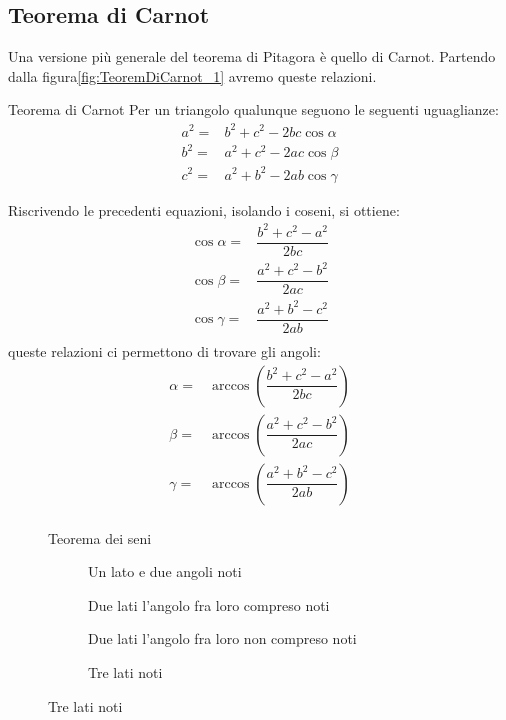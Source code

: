 \subsection{Teorema di Carnot}
Una versione più generale del teorema di Pitagora è quello di Carnot. Partendo dalla figura\nobs\vref{fig:TeoremDiCarnot_1} avremo queste relazioni.
\begin{teoremat}{Teorema di Carnot}{}
	Per un triangolo qualunque seguono le seguenti uguaglianze:
	\begin{align*}
	a^2=&b^2+c^2-2bc\cos\alpha\\
	b^2=&a^2+c^2-2ac\cos\beta\\
	c^2=&a^2+b^2-2ab\cos\gamma
	\end{align*}
\end{teoremat}
Riscrivendo  le precedenti equazioni, isolando i coseni, si ottiene:
\begin{align*}
\cos\alpha=&\dfrac{b^2+c^2-a^2}{2bc}\\
\cos\beta=&\dfrac{a^2+c^2-b^2}{2ac}\\
\cos\gamma=&\dfrac{a^2+b^2-c^2}{2ab}\\
\end{align*}
queste relazioni ci  permettono di trovare gli angoli:
\begin{align*}
\alpha=&\arccos(\dfrac{b^2+c^2-a^2}{2bc})\\
\beta=&\arccos(\dfrac{a^2+c^2-b^2}{2ac})\\
\gamma=&\arccos(\dfrac{a^2+b^2-c^2}{2ab})\\
\end{align*}
\begin{figure}
	\centering
	
	\caption{Teorema dei seni}
	\label{fig:TeoremDeiSeni}
\end{figure}
\begin{figure}
	\begin{subfigure}[b]{.5\linewidth}
		\centering

	\caption{Un lato e due angoli noti}
	\label{fig:risTriangQqualunque_1}
	\end{subfigure}%
	\begin{subfigure}[b]{.5\linewidth}
		\centering
	
		\caption{Due lati l'angolo fra loro compreso noti}
		\label{fig:risTriangQqualunque_2}
	\end{subfigure}
	\begin{subfigure}[b]{.5\linewidth}
		\centering
		
		\caption{Due lati l'angolo fra loro non compreso noti}
		\label{fig:risTriangQqualunque_3}
	\end{subfigure}%
	\begin{subfigure}[b]{.5\linewidth}
		\centering
		
		\caption{Tre lati noti}
		\label{fig:risTriangQqualunque_4}
	\end{subfigure}
	\label{fig:RisoluzioneTriangoliQualunque}
\end{figure}
